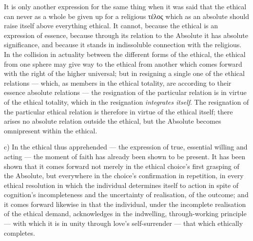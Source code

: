 \documentclass[12pt,a4paper]{book}
\begin{document}
It is only another expression for the same thing when it was said that the
ethical can never as a whole be given up for a religious τέλος which as an
absolute should raise itself above everything ethical. It cannot, because the
ethical is an expression of essence, because through its relation to the
Absolute it has absolute
significance, and because it stands in indissoluble connection with the
religious. In the collision in actuality between the different forms of the
ethical, the ethical from one sphere may give way to the ethical from another
which comes forward with the right of the higher universal; but in resigning a
single one of the ethical relations --- which, as members in the ethical
totality, are according to their essence absolute relations --- the
resignation of the particular relation is in virtue of the ethical totality,
which in the resignation \emph{integrates itself}. The resignation of the
particular ethical relation is therefore in virtue of the ethical itself;
there arises no absolute relation outside the ethical, but the Absolute
becomes omnipresent within the ethical.

c) In the ethical thus apprehended --- the expression of true, essential
willing and acting --- the moment of faith has already been shown to be
present. It has been shown that it comes forward not merely in the ethical
choice's first grasping of the Absolute, but everywhere in the choice's
confirmation in repetition, in every ethical resolution in which the
individual determines itself to action in spite of cognition's incompleteness
and the uncertainty of realisation, of the outcome; and it comes forward
likewise in that the individual, under the incomplete realisation of the
ethical demand, acknowledges in the indwelling, through-working principle ---
with which it is in unity through love's self-surrender --- that which
ethically completes.
\end{document}
